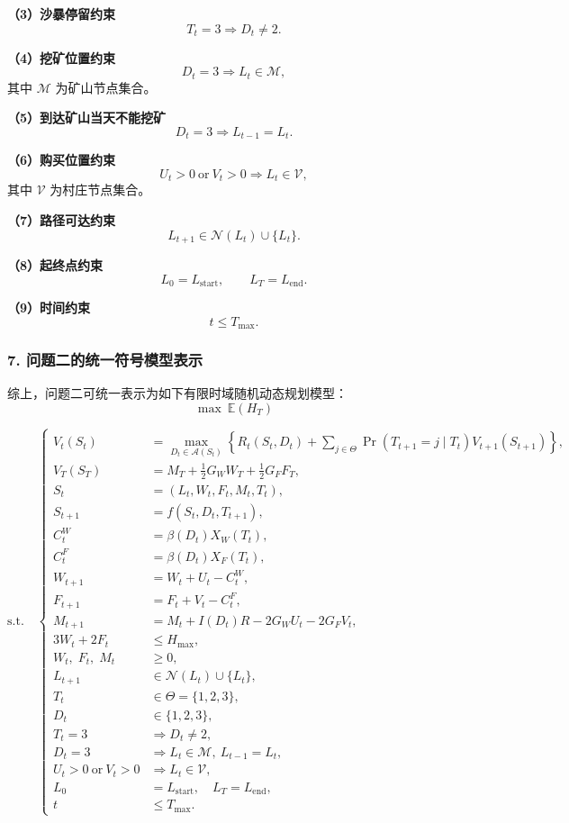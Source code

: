 \documentclass[UTF8,a4paper,12pt]{ctexart}
\begin{document}
\textbf{（3）沙暴停留约束}
\[
T_t=3\Rightarrow D_t\neq 2.
\]

\textbf{（4）挖矿位置约束}
\[
D_t=3\Rightarrow L_t\in \mathcal{M},
\]
其中 $\mathcal{M}$ 为矿山节点集合。

\textbf{（5）到达矿山当天不能挖矿}
\[
D_t=3\Rightarrow L_{t-1}=L_t.
\]

\textbf{（6）购买位置约束}
\[
U_t>0\ \text{or}\ V_t>0 \Rightarrow L_t\in \mathcal{V},
\]
其中 $\mathcal{V}$ 为村庄节点集合。

\textbf{（7）路径可达约束}
\[
L_{t+1}\in \mathcal{N}(L_t)\cup\{L_t\}.
\]

\textbf{（8）起终点约束}
\[
L_0=L_{\mathrm{start}},\qquad L_T=L_{\mathrm{end}}.
\]

\textbf{（9）时间约束}
\[
t\le T_{\max}.
\]

\subsubsection*{7. 问题二的统一符号模型表示}

综上，问题二可统一表示为如下有限时域随机动态规划模型：
\[
\max\ \mathbb{E}(H_T)
\]

\[
\mathrm{s.t.}\quad
\left\{
\begin{aligned}
V_t(S_t)
&=
\max_{D_t\in\mathcal{A}(S_t)}
\left\{
R_t(S_t,D_t)
+\sum_{j\in\Theta}\Pr(T_{t+1}=j\mid T_t)V_{t+1}(S_{t+1})
\right\},
\\[4pt]
V_T(S_T)
&=
M_T+\frac12 G_WW_T+\frac12 G_FF_T,
\\[4pt]
S_t&=(L_t,W_t,F_t,M_t,T_t),
\\[4pt]
S_{t+1}&=f(S_t,D_t,T_{t+1}),
\\[4pt]
C_t^W&=\beta(D_t)X_W(T_t),
\\[4pt]
C_t^F&=\beta(D_t)X_F(T_t),
\\[4pt]
W_{t+1}&=W_t+U_t-C_t^W,
\\[4pt]
F_{t+1}&=F_t+V_t-C_t^F,
\\[4pt]
M_{t+1}&=M_t+I(D_t)R-2G_WU_t-2G_FV_t,
\\[4pt]
3W_t+2F_t&\le H_{\max},
\\[4pt]
W_t,\;F_t,\;M_t&\ge 0,
\\[4pt]
L_{t+1}&\in\mathcal{N}(L_t)\cup\{L_t\},
\\[4pt]
T_t&\in\Theta=\{1,2,3\},
\\[4pt]
D_t&\in\{1,2,3\},
\\[4pt]
T_t=3&\Rightarrow D_t\neq 2,
\\[4pt]
D_t=3&\Rightarrow L_t\in\mathcal{M},\ L_{t-1}=L_t,
\\[4pt]
U_t>0\ \text{or}\ V_t>0&\Rightarrow L_t\in\mathcal{V},
\\[4pt]
L_0&=L_{\mathrm{start}},\quad L_T=L_{\mathrm{end}},
\\[4pt]
t&\le T_{\max}.
\end{aligned}
\right.
\]
\end{document}
